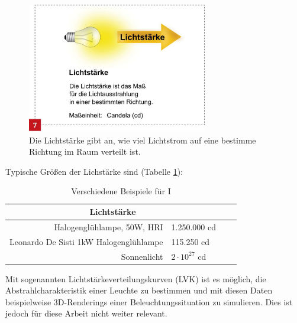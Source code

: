  \begin{figure}[H]     %
\centering
\includegraphics[width=0.7\textwidth]{bilder/candela} 
\caption {Die Lichtstärke gibt an, wie viel Lichtstrom auf eine bestimme Richtung im Raum verteilt ist\protect\footnotemark.}\label{b_candela}
\end{figure}

\noindent Typische Größen der Lichstärke sind (Tabelle \ref{t_candela}):

\begin{table}[htp] 
		\centering
		\begin{tabular}{rlcc}  %
		\toprule
		\multicolumn{2}{c}{\large\sffamily Lichtstärke}\\ 							
		\midrule
		Halogenglühlampe, 50W, HRI & 1.250.000 cd\\
		Leonardo De Sisti 1kW Halogenglühlampe &  115.250 cd\\
		Sonnenlicht & $2 \cdot 10^{27}$ cd\\
		\bottomrule
		\end{tabular}
		\caption{Verschiedene Beispiele für I\protect\footnotemark}	
		\label{t_candela}
	\end{table}

\noindent Mit sogenannten Lichtstärkeverteilungskurven (LVK) ist es möglich, die Abstrahlcharakteristik einer Leuchte zu bestimmen und mit diesen Daten beispielweise 3D-Renderings einer Beleuchtungssituation zu simulieren. Dies ist jedoch für diese Arbeit nicht weiter relevant.

\newpage
